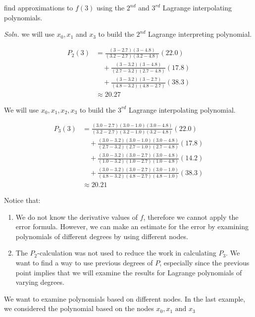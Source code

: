 \documentclass[12pt]{article}
\newcommand{\soln}{\textit{Soln.}\xspace}
\begin{document}
find approximations to $f(3)$ using the $2^{nd}$ and $3^{rd}$ Lagrange
interpolating polynomials.

\soln we will use $x_0, x_1$ and $x_3$ to build the $2^{nd}$ Lagrange
interpreting polynomial.

\begin{align*}
P_2(3) &= \frac{(3 - 2.7)(3 - 4.8)}{(3.2 - 2.7)(3.2 - 4.8)} (22.0) \\
&\quad + \frac{(3 - 3.2)(3 - 4.8)}{(2.7 - 3.2)(2.7 - 4.8)} (17.8) \\
&\quad + \frac{(3 - 3.2)(3 - 2.7)}{(4.8 - 3.2)(4.8 - 2.7)} (38.3) \\
&\approx 20.27
\end{align*}

We will use $x_0, x_1, x_2, x_3$ to build the $3^{rd}$ Lagrange
interpolating polynomial.

\begin{align*}
P_3(3) &= \frac{(3.0 - 2.7)(3.0 - 1.0)(3.0 - 4.8)}{(3.2 - 2.7)(3.2 - 1.0)(3.2 - 4.8)} (22.0) \\
&\quad + \frac{(3.0 - 3.2)(3.0 - 1.0)(3.0 - 4.8)}{(2.7 - 3.2)(2.7 - 1.0)(2.7 - 4.8)} (17.8) \\
&\quad + \frac{(3.0 - 3.2)(3.0 - 2.7)(3.0 - 4.8)}{(1.0 - 3.2)(1.0 - 2.7)(1.0 - 4.8)} (14.2) \\
&\quad + \frac{(3.0 - 3.2)(3.0 - 2.7)(3.0 - 1.0)}{(4.8 - 3.2)(4.8 - 2.7)(4.8 - 1.0)} (38.3) \\
&\approx 20.21
\end{align*}

Notice that:

\begin{enumerate}
\item We do not know the derivative values of $f$, therefore we cannot apply 
  the error formula. However, we can make an estimate for the error by examining
  polynomials of different degrees by using different nodes.

\item The $P_2$-calculation was not used to reduce the work in calculating $P_3$.
  We want to find a way to use previous degrees of $P$, especially since the 
  previous point implies that we will examine the results for Lagrange 
  polynomials of varying degrees.
\end{enumerate}

\noindent
We want to examine polynomials based on different nodes. In the last example, 
we considered the polynomial based on the nodes $x_0, x_1 \text{ and } x_3$
\end{document}
